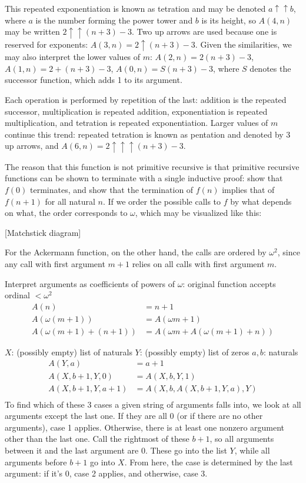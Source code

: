 \documentclass{article}
\begin{document}
This repeated exponentiation is known as tetration
and may be denoted $a \uparrow \uparrow b$,
where $a$ is the number forming the power tower
and $b$ is its height,
so $A(4, n)$ may be written $2\uparrow\uparrow(n+3)-3$.
Two up arrows are used because one is reserved for exponents:
$A(3, n) = 2\uparrow(n+3)-3$.
Given the similarities,
we may also interpret the lower values of $m$:
$A(2, n) = 2(n+3)-3$, $A(1, n) = 2+(n+3)-3$, $A(0, n) = S(n+3)-3$,
where $S$ denotes the successor function,
which adds 1 to its argument.

Each operation is performed by repetition of the last:
addition is the repeated successor,
multiplication is repeated addition,
exponentiation is repeated multiplication,
and tetration is repeated exponentiation.
Larger values of $m$ continue this trend:
repeated tetration is known as pentation and denoted by 3 up arrows,
and $A(6, n) = 2\uparrow\uparrow\uparrow(n+3)-3$.

The reason that this function is not primitive recursive
is that primitive recursive functions can be shown to terminate with a single inductive proof:
show that $f(0)$ terminates,
and show that the termination of $f(n)$ implies that of $f(n+1)$ for all natural $n$.
If we order the possible calls to $f$ by what depends on what,
the order corresponds to $\omega$,
which may be visualized like this:

[Matchstick diagram]

For the Ackermann function, on the other hand,
the calls are ordered by $\omega^2$,
since any call with first argument $m+1$
relies on all calls with first argument $m$.

Interpret arguments as coefficients of powers of $\omega$:
original function accepts ordinal $<\omega^2$
\begin{align*}
  A(n) &= n+1 \\
  A(\omega(m+1)) &= A(\omega m+1) \\
  A(\omega(m+1)+(n+1)) &= A(\omega m+A(\omega(m+1)+n))
\end{align*}

$X$: (possibly empty) list of naturals
$Y$: (possibly empty) list of zeros
$a, b$: naturals
\begin{align*}
  A(Y, a) &= a+1 \\
  A(X, b+1, Y, 0) &= A(X, b, Y, 1) \\
  A(X, b+1, Y, a+1) &= A(X, b, A(X, b+1, Y, a), Y) \\
\end{align*}
To find which of these 3 cases a given string of arguments falls into,
we look at all arguments except the last one.
If they are all 0 (or if there are no other arguments), case 1 applies.
Otherwise, there is at least one nonzero argument other than the last one.
Call the rightmost of these $b+1$,
so all arguments between it and the last argument are 0.
These go into the list $Y$,
while all arguments before $b+1$ go into $X$.
From here, the case is determined by the last argument:
if it's 0, case 2 applies,
and otherwise, case 3.
\end{document}
